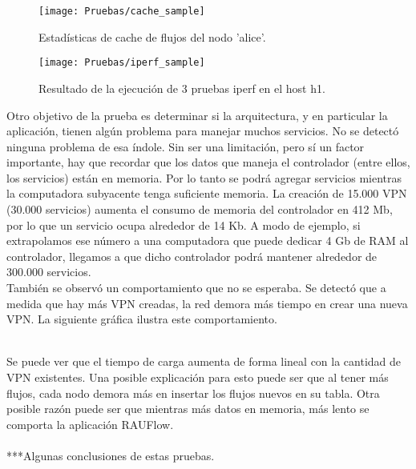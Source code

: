 \begin{figure}[t]
	\caption{Estadísticas de cache de flujos del nodo 'alice'.}
	\texttt{[image: Pruebas/cache\_sample]}
	\centering
	\label{fig:cache_sample}
\end{figure}

\begin{figure}[t]
	\caption{Resultado de la ejecución de 3 pruebas iperf en el host h1.}
	\texttt{[image: Pruebas/iperf\_sample]}
	\centering
	\label{fig:iperf_sample}
\end{figure}

Otro objetivo de la prueba es determinar si la arquitectura, y en particular la aplicación, tienen algún problema para manejar muchos servicios. No se detectó ninguna problema de esa índole. Sin ser una limitación, pero sí un factor importante, hay que recordar que los datos que maneja el controlador (entre ellos, los servicios) están en memoria. Por lo tanto se podrá agregar servicios mientras la computadora subyacente tenga suficiente memoria. La creación de 15.000 VPN (30.000 servicios) aumenta el consumo de memoria del controlador en 412 Mb, por lo que un servicio ocupa alrededor de 14 Kb. A modo de ejemplo, si extrapolamos ese número a una computadora que puede dedicar 4 Gb de RAM al controlador, llegamos a que dicho controlador podrá mantener alrededor de 300.000 servicios. \\

También se observó un comportamiento que no se esperaba. Se detectó que a medida que hay más VPN creadas, la red demora más tiempo en crear una nueva VPN. La siguiente gráfica ilustra este comportamiento. \\ \\
Se puede ver que el tiempo de carga aumenta de forma lineal con la cantidad de VPN existentes. Una posible explicación para esto puede ser que al tener más flujos, cada nodo demora más en insertar los flujos nuevos en su tabla. Otra posible razón puede ser que mientras más datos en memoria, más lento se comporta la aplicación RAUFlow. \\ \\

***Algunas conclusiones de estas pruebas.